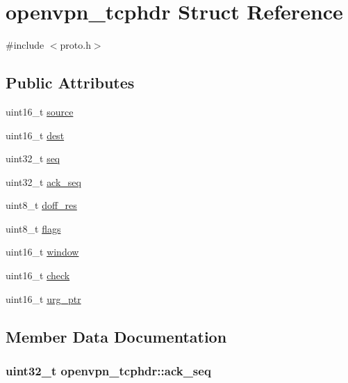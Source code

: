 \hypertarget{structopenvpn__tcphdr}{}\section{openvpn\+\_\+tcphdr Struct Reference}
\label{structopenvpn__tcphdr}


{\ttfamily \#include $<$proto.\+h$>$}

\subsection*{Public Attributes}
\begin{DoxyCompactItemize}
\item 
uint16\+\_\+t \hyperlink{structopenvpn__tcphdr_a0664596f4310450226d641795a4cccaf}{source}
\item 
uint16\+\_\+t \hyperlink{structopenvpn__tcphdr_af077b0e2e5fe3cbab0ee72dd65b4785d}{dest}
\item 
uint32\+\_\+t \hyperlink{structopenvpn__tcphdr_a76521dd8a330ed57d18a20860a702891}{seq}
\item 
uint32\+\_\+t \hyperlink{structopenvpn__tcphdr_a726c040d55bf0c0c7714f72a7e9bdf89}{ack\+\_\+seq}
\item 
uint8\+\_\+t \hyperlink{structopenvpn__tcphdr_a5353ce960c112894f7bdbd06a3eac876}{doff\+\_\+res}
\item 
uint8\+\_\+t \hyperlink{structopenvpn__tcphdr_a5f2065e3004a3dc829cc24b59cadf3e1}{flags}
\item 
uint16\+\_\+t \hyperlink{structopenvpn__tcphdr_a45d868503d531a6a7febdd4677955607}{window}
\item 
uint16\+\_\+t \hyperlink{structopenvpn__tcphdr_a556ad5c4cd349684cedb3a1cc706affe}{check}
\item 
uint16\+\_\+t \hyperlink{structopenvpn__tcphdr_a8a2190658a24123c97b86761d12dcdbe}{urg\+\_\+ptr}
\end{DoxyCompactItemize}


\subsection{Member Data Documentation}
\hypertarget{structopenvpn__tcphdr_a726c040d55bf0c0c7714f72a7e9bdf89}{}
\subsubsection[{ack\+\_\+seq}]{\setlength{\rightskip}{0pt plus 5cm}uint32\+\_\+t openvpn\+\_\+tcphdr\+::ack\+\_\+seq}\label{structopenvpn__tcphdr_a726c040d55bf0c0c7714f72a7e9bdf89}
\hypertarget{structopenvpn__tcphdr_a556ad5c4cd349684cedb3a1cc706affe}{}
